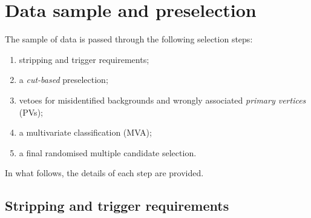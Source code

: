 \section{Data sample and preselection}
\label{sec:sample_and_selection}

The sample of data is passed through the following selection steps:
\begin{enumerate}[noitemsep,topsep=0pt]
	\item stripping and trigger requirements;
	\item a \emph{cut-based} preselection;
	\item vetoes for misidentified backgrounds and wrongly associated \emph{primary vertices} (PVs);
	\item a multivariate classification (MVA);
	\item a final randomised multiple candidate selection.
\end{enumerate}
In what follows, the details of each step are provided.

\subsection{Stripping and trigger requirements}
\label{sec:stripping}

